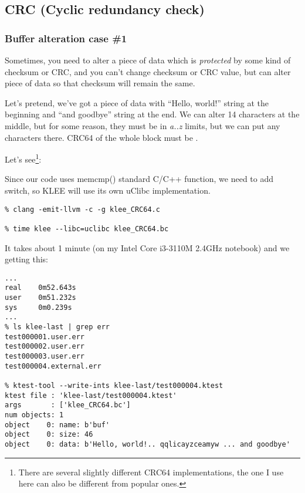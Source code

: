 \subsection{CRC (Cyclic redundancy check)}

\renewcommand{\CURPATH}{CRC/KLEE}

\subsubsection{Buffer alteration case \#1}

Sometimes, you need to alter a piece of data which is \textit{protected} by some kind of checksum or \ac{CRC}, and you can't change checksum or CRC value, but can alter piece of data so that checksum will remain the same.

Let's pretend, we've got a piece of data with ``Hello, world!'' string at the beginning and ``and goodbye'' string at the end.
We can alter 14 characters at the middle, but for some reason, they must be in \textit{a..z} limits, but we can put any characters there.
CRC64 of the whole block must be .

Let's see\footnote{There are several slightly different CRC64 implementations, the one I use here can also be different from popular ones.}:



Since our code uses memcmp() standard C/C++ function, we need to add  switch, so KLEE will use its own uClibc 
implementation. %

\begin{lstlisting}
% clang -emit-llvm -c -g klee_CRC64.c

% time klee --libc=uclibc klee_CRC64.bc
\end{lstlisting}

It takes about 1 minute (on my Intel Core i3-3110M 2.4GHz notebook) and we getting this:

\begin{lstlisting}
...
real    0m52.643s
user    0m51.232s
sys     0m0.239s
...
% ls klee-last | grep err
test000001.user.err
test000002.user.err
test000003.user.err
test000004.external.err

% ktest-tool --write-ints klee-last/test000004.ktest
ktest file : 'klee-last/test000004.ktest'
args       : ['klee_CRC64.bc']
num objects: 1
object    0: name: b'buf'
object    0: size: 46
object    0: data: b'Hello, world!.. qqlicayzceamyw ... and goodbye'
\end{lstlisting}

